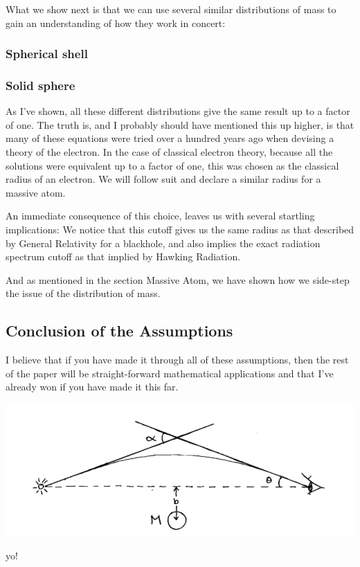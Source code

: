 \documentclass {article}
\begin{document}
What we show next is that we can use several similar distributions of mass to gain an understanding of how they work in concert:

\subsubsection{Spherical shell}

\subsubsection{Solid sphere}

As I’ve shown, all these different distributions give the same result up to a factor of one. The truth is, and I probably should have mentioned this up higher, is that many of these equations were tried over a hundred years ago when devising a theory of the electron. In the case of classical electron theory, because all the solutions were equivalent up to a factor of one, this was chosen as the classical radius of an electron. We will follow suit and declare a similar radius for a massive atom.

An immediate consequence of this choice, leaves us with several startling implications: We notice that this cutoff gives us the same radius as that described by General Relativity for a blackhole, and also implies the exact radiation spectrum cutoff as that implied by Hawking Radiation.

And as mentioned in the section Massive Atom, we have shown how we side-step the issue of the distribution of mass.

\subsection{Conclusion of the Assumptions}

I believe that if you have made it through all of these assumptions, then the rest of the paper will be straight-forward mathematical applications and that I’ve already won if you have made it this far.

\begin{center}
\includegraphics[scale=0.5]{light-bending.png}
\end{center}

yo!
\end{document}
